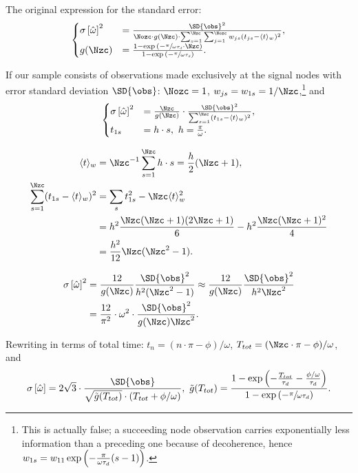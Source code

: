 \documentclass[14pt]{article}
\begin{document}
The original expression for the standard error:	
\begin{equation}
\begin{cases}
		\SE{\hat{\omega}}^2 &= \frac{\SD{\obs}^2}{\Nozc\cdot g(\Nzc)\cdot \sum_{s=1}^{\Nzc}\sum_{j=1}^{\Nozc} w_{js} (t_{js} - \avg{t}_w)^2}, \\
		g(\Nzc) &= \frac{1-\exp{(-\sfrac{\pi}{\omega\tau_d}\cdot \Nzc)}}{1 - \exp{(-\sfrac{\pi}{\omega\tau_d})}}.
\end{cases}
\end{equation}
	
If our sample consists of observations made exclusively at the signal nodes with error standard deviation $\SD{\obs}$: $\Nozc = 1$, $w_{js} = w_{1s} = 1/\Nzc$,\footnote{This is actually false; a succeeding node observation carries exponentially less information than a preceding one because of decoherence, hence $w_{1s} = w_{11}\exp\bkt{-\frac{\pi}{\omega\tau_d}(s-1)}$.} and
\begin{equation}
	\begin{cases}
	\SE{\hat{\omega}}^2 &= \frac{\Nzc}{g(\Nzc)}\cdot \frac{\SD{\obs}^2}{\sum_{s=1}^{\Nzc}(t_{1s} - \avg{t}_w)^2}, \\
	t_{1s} &= h\cdot s, ~ h = \frac{\pi}{\omega}.
	\end{cases}
\end{equation}

\begin{align*}
	\avg{t}_w &= \Nzc^{-1}\sum_{s=1}^{\Nzc}h\cdot s = \frac{h}{2}(\Nzc+1), \\
	\sum_{s=1}^{\Nzc}(t_{1s} - \avg{t}_w)^2 &= \sum_s t_{1s}^2 - \Nzc\avg{t}_w^2 \\
			&= h^2\frac{\Nzc(\Nzc+1)(2\Nzc+1)}{6} - h^2\frac{\Nzc(\Nzc+1)^2}{4} \\
			&= \frac{h^2}{12}\Nzc(\Nzc^2-1).
\end{align*}
	
\begin{align}
	\SE{\hat{\omega}}^2 &= \frac{12}{g(\Nzc)}\frac{\SD{\obs}^2}{h^2(\Nzc^2-1)} \approx \frac{12}{g(\Nzc)}\frac{\SD{\obs}^2}{h^2\Nzc^2} \notag \\
		&= \frac{12}{\pi^2}\cdot\omega^2\cdot\frac{\SD{\obs}^2}{g(\Nzc)\Nzc^2}.
\end{align}

Rewriting in terms of total time: $t_n = (n\cdot\pi - \phi)/\omega$, $T_{tot} = (\Nzc\cdot\pi-\phi)/\omega$, and
\begin{equation}
	\SE{\hat{\omega}} = 2\sqrt{3}\cdot\frac{\SD{\obs}}{\sqrt{\tilde{g}(T_{tot})}\cdot\bkt{T_{tot} + \phi/\omega}}, ~ \tilde{g}(T_{tot}) = \frac{1-\exp{\bkt{-\frac{T_{tot}}{\tau_d} - \frac{\phi/\omega}{\tau_d}}}}{1-\exp{(-\sfrac{\pi}{\omega\tau_d})}}.
\end{equation}
\end{document}
